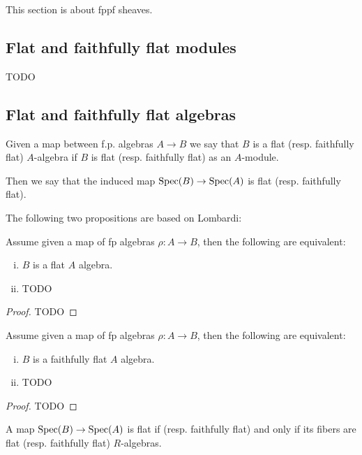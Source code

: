 This section is about fppf sheaves.

\subsection{Flat and faithfully flat modules}

TODO

\subsection{Flat and faithfully flat algebras}

\begin{definition}
Given a map between f.p. algebras $A\to B$ we say that $B$ is a flat (resp. faithfully flat) $A$-algebra if $B$ is flat (resp. faithfully flat) as an $A$-module.

Then we say that the induced map $\operatorname{Spec}(B)\to \operatorname{Spec}(A)$ is flat (resp. faithfully flat).
\end{definition}

The following two propositions are based on Lombardi:

\begin{proposition}
Assume given a map of fp algebras $\rho:A\to B$, then the following are equivalent:
\begin{enumerate}[(i)]
\item $B$ is a flat $A$ algebra.
\item TODO
\end{enumerate}
\end{proposition}

\begin{proof}
TODO
\end{proof}

\begin{proposition}
Assume given a map of fp algebras $\rho:A\to B$, then the following are equivalent:
\begin{enumerate}[(i)]
\item $B$ is a faithfully flat $A$ algebra.
\item TODO
\end{enumerate}
\end{proposition}

\begin{proof}
TODO
\end{proof}

\begin{lemma}
A map $\operatorname{Spec}(B)\to \operatorname{Spec}(A)$ is flat if (resp. faithfully flat) and only if its fibers are flat (resp. faithfully flat) $R$-algebras.
\end{lemma}

